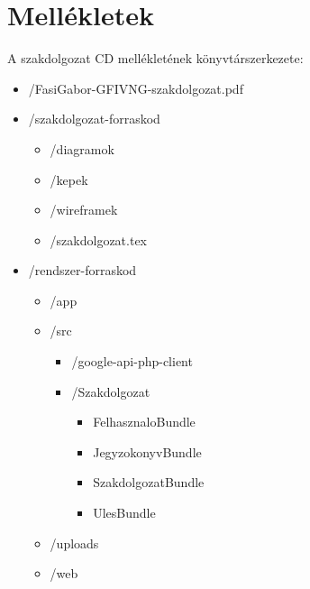 \documentclass[a4paper,12pt,oneside]{report}
\begin{document}
\newpage
\thispagestyle{empty}
\section*{Mellékletek}

A szakdolgozat CD mellékletének könyvtárszerkezete:

\begin{itemize}
	\item[] /FasiGabor-GFIVNG-szakdolgozat.pdf
	\item[] /szakdolgozat-forraskod
		\begin{itemize}
			\item[] /diagramok
			\item[] /kepek
			\item[] /wireframek
			\item[] /szakdolgozat.tex
		\end{itemize}

	\item[] /rendszer-forraskod
		\begin{itemize}
			\item[] /app
			\item[] /src
				\begin{itemize}
					\item[] /google-api-php-client
					\item[] /Szakdolgozat
						\begin{itemize}
							\item[] FelhasznaloBundle
							\item[] JegyzokonyvBundle
							\item[] SzakdolgozatBundle
							\item[] UlesBundle
						\end{itemize}
				\end{itemize}

			\item[] /uploads
			\item[] /web
		\end{itemize}


\end{itemize}
\end{document}
